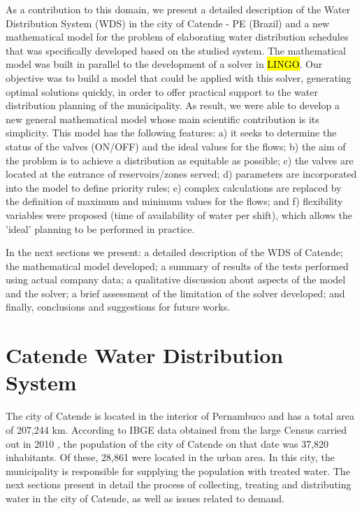 \documentclass{singlecol}
\theoremstyle{TH}{
\newtheorem{lemma}{Lemma}
\newtheorem{theorem}[lemma]{Theorem}
\newtheorem{corrolary}[lemma]{Corrolary}
\newtheorem{conjecture}[lemma]{Conjecture}
\newtheorem{proposition}[lemma]{Proposition}
\newtheorem{claim}[lemma]{Claim}
\newtheorem{stheorem}[lemma]{Wrong Theorem}
\newtheorem{algorithm}{Algorithm}
}
\theoremstyle{THrm}{
\newtheorem{definition}{Definition}[section]
\newtheorem{question}{Question}[section]
\newtheorem{remark}{Remark}
\newtheorem{scheme}{Scheme}
}
\theoremstyle{THhit}{
\newtheorem{case}{Case}[section]
}
\begin{document}
As a contribution to this domain, we present a detailed description of the Water Distribution System (WDS) in the city of Catende - PE (Brazil) and a new mathematical model for the problem of elaborating water distribution schedules that was specifically developed based on the studied system. The mathematical model was built in parallel to the development of a solver in \hl{LINGO}. Our objective was to build a model that could be applied with this solver, generating optimal solutions quickly, in order to offer practical support to the water distribution planning of the municipality. As result, we were able to develop a new general mathematical model whose main scientific contribution is its simplicity. This model has the following features: a) it seeks to determine the status of the valves (ON/OFF) and the ideal values for the flows; b) the aim of the problem is to achieve a distribution as equitable as possible; c) the valves are located at the entrance of reservoirs/zones served; d) parameters are incorporated into the model to define priority rules; e) complex calculations are replaced by the definition of maximum and minimum values for the flows; and f) flexibility variables were proposed (time of availability of water per shift), which allows the 'ideal' planning to be performed in practice. 

In the next sections we present: a detailed description of the WDS of Catende; the mathematical model developed; a summary of results of the tests performed using actual company data; a qualitative discussion about aspects of the model and the solver; a brief assessment of the limitation of the solver developed; and finally, conclusions and suggestions for future works. 

\section{Catende Water Distribution System}
\label{sec:CatendeWDS}

The city of Catende is located in the interior of Pernambuco and has a total area of 207,244 km. According to IBGE data obtained from the large Census carried out in 2010 \citep{IBGECatende}, the population of the city of Catende on that date was 37,820 inhabitants. Of these, 28,861 were located in the urban area. In this city, the municipality is responsible for supplying the population with treated water. The next sections present in detail the process of collecting, treating and distributing water in the city of Catende, as well as issues related to demand. 
\end{document}

